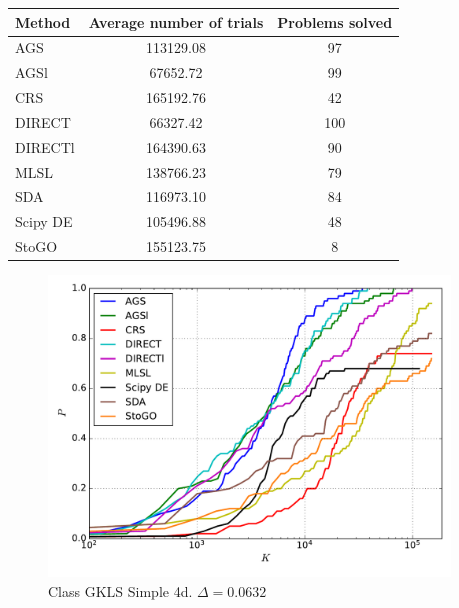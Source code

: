 \documentclass[a4paper]{article}
\begin{document}
\begin{tabular}{lcc}
\hline
 Method   &  Average number of trials  &  Problems solved  \\
\hline
 AGS      &         113129.08          &        97         \\
 AGSl     &          67652.72          &        99         \\
 CRS      &         165192.76          &        42         \\
 DIRECT   &          66327.42          &        100        \\
 DIRECTl  &         164390.63          &        90         \\
 MLSL     &         138766.23          &        79         \\
 SDA      &         116973.10          &        84         \\
 Scipy DE &         105496.88          &        48         \\
 StoGO    &         155123.75          &         8         \\
\hline
\end{tabular}
\begin{figure}[H]
  \center
  \includegraphics[width=0.95\textwidth]{../experiments/gklss4d_serg/cmc.pdf}
  \caption{Class GKLS Simple 4d. $\Delta=0.0632$}
\end{figure}
\end{document}
